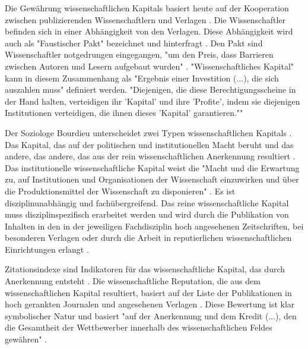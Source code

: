 Die Gewährung wissenschaftlichen Kapitals basiert heute auf der Kooperation zwischen publizierenden Wissenschaftlern und Verlagen \cite{herb_2006}. Die Wissenschaftler befinden sich in einer Abhängigkeit von den Verlagen. Diese Abhängigkeit wird auch als "Faustischer Pakt" bezeichnet und hinterfragt \cite{hagner_2015_sache_buches} \cite{Parks_2002_acadamic_faust}. Den Pakt sind Wissenschaftler notgedrungen eingegangen, "um den Preis, dass Barrieren zwischen Autoren und Lesern aufgebaut wurden" \cite{hagner_2015_sache_buches}. "Wissenschaftliches Kapital" kann in diesem Zusammenhang als "Ergebnis einer Investition (...), die sich auszahlen muss" \cite{herb_2006} definiert werden. "Diejenigen, die diese Berechtigungsscheine in der Hand halten, verteidigen ihr 'Kapital' und ihre 'Profite', indem sie diejenigen Institutionen verteidigen, die ihnen dieses 'Kapital' garantieren."" \cite{Bourdieu_1992}

Der Soziologe Bourdieu unterscheidet zwei Typen wissenschaftlichen Kapitals \cite{Bourdieu_1998}. Das Kapital, das auf der politischen und institutionellen Macht beruht und das andere, das andere, das aus der rein wissenschaftlichen Anerkennung resultiert \cite{mikl_2010_soziologie}. Das institutionelle wissenschaftliche Kapital weist die "Macht und die Erwartung zu, auf Institutionen und Organisationen der Wissenschaft einzuwirken und über die Produktionsmittel der Wissenschaft zu disponieren" \cite[:257]{Barl_sius_2008}. Es ist disziplinunabhängig und fachübergreifend. Das reine wissenschaftliche Kapital muss disziplinspezifisch erarbeitet werden und wird durch die Publikation von Inhalten in den in der jeweiligen Fachdisziplin hoch angesehenen Zeitschriften, bei besonderen Verlagen oder durch die Arbeit in reputierlichen wissenschaftlichen Einrichtungen erlangt \cite[:257]{Barl_sius_2008}.

Zitationsindexe sind Indikatoren für das wissenschaftliche Kapital, das durch Anerkennung entsteht \cite{Bourdieu_1998}. Die wissenschaftliche Reputation, die aus dem wissenschaftlichen Kapital resultiert, basiert auf der Liste der Publikationen in hoch gerankten Journalen und angesehenen Verlagen \cite{herb_2010}. Diese Bewertung ist klar symbolischer Natur und basiert "auf der Anerkennung und dem Kredit (...), den die Gesamtheit der Wettbewerber innerhalb des wissenschaftlichen Feldes gewähren" \cite{Bourdieu_1998} \cite{Barl_sius_2008} \cite{herb_2010}.

